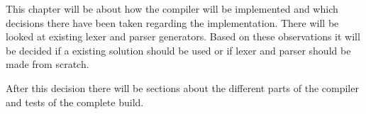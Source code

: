 This chapter will be about how the compiler will be implemented and which decisions there have been taken regarding the implementation. There will be looked at existing lexer and parser generators. Based on these observations it will be decided if a existing solution should be used or if lexer and parser should be made from scratch.

After this decision there will be sections about the different parts of the compiler and tests of the complete build.